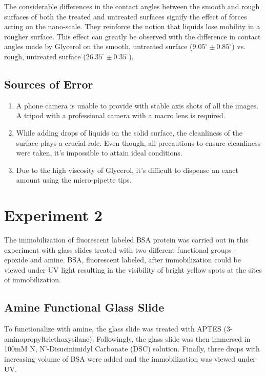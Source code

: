 \documentclass[pdflatex,sn-mathphys]{sn-jnl}%
\theoremstyle{thmstyleone}%
\theoremstyle{thmstyletwo}%
\theoremstyle{thmstylethree}%
\begin{document}
The considerable differences in the contact angles between the smooth and rough surfaces of both the treated and untreated surfaces signify the effect of forces acting on the nano-scale. They reinforce the notion that liquids lose mobility in a rougher surface. This effect can greatly be observed with the difference in contact angles made by Glycerol on the smooth, untreated surface ($9.05^\circ\pm0.85^\circ$) vs. rough, untreated surface ($26.35^\circ\pm0.35^\circ$).

\subsection{Sources of Error}\label{subsec2}
\begin{enumerate}
\item A phone camera is unable to provide with stable axis shots of all the images. A tripod with a professional camera with a macro lens is required.
\item While adding drops of liquids on the solid surface, the cleanliness of the surface plays a crucial role. Even though, all precautions to ensure cleanliness were taken, it's impossible to attain ideal conditions.
\item Due to the high viscosity of Glycerol, it's difficult to dispense an exact amount using the micro-pipette tips.
\end{enumerate}

\section{Experiment 2}\label{sec1}
The immobilization of fluorescent labeled BSA protein was carried out in this experiment with glass slides treated with two different functional groups - epoxide and amine. BSA, fluorescent labeled, after immobilization could be viewed under UV light resulting in the visibility of bright yellow spots at the sites of immobilization. 
 
\subsection{Amine Functional Glass Slide}\label{subsec2}
To functionalize with amine, the glass slide was treated with APTES (3-aminopropyltriethoxysilane). Followingly, the glass slide was then immersed in 100mM N, N'-Disucinimidyl Carbonate (DSC) solution. Finally, three drops with increasing volume of BSA were added and the immobilization was viewed under UV. 
\end{document}
